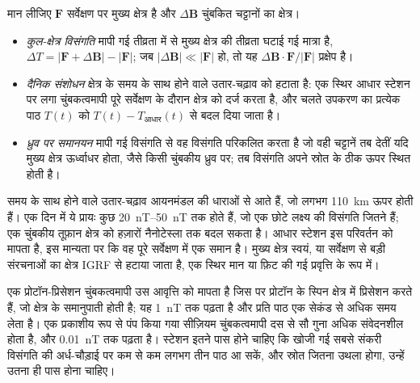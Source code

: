 \begin{definition}[कुल-क्षेत्र विसंगति; दैनिक संशोधन; ध्रुव पर समानयन]\label{def:b3:field-lab-methods-3:magnetic}
मान लीजिए $\mathbf{F}$ सर्वेक्षण पर मुख्य क्षेत्र है और $\Delta\mathbf{B}$
चुंबकित चट्टानों का क्षेत्र।
\begin{itemize}
  \item \emph{कुल-क्षेत्र विसंगति} मापी गई तीव्रता में से
        मुख्य क्षेत्र की तीव्रता घटाई गई मात्रा है, $\Delta T =
        |\mathbf{F} + \Delta\mathbf{B}| - |\mathbf{F}|$; जब
        $|\Delta\mathbf{B}| \ll |\mathbf{F}|$ हो, तो यह
        $\Delta\mathbf{B}\cdot\mathbf{F}/|\mathbf{F}|$ प्रक्षेप है।
  \item \emph{दैनिक संशोधन} क्षेत्र के समय के साथ होने वाले
        उतार-चढ़ाव को हटाता है: एक स्थिर आधार स्टेशन पर लगा चुंबकत्वमापी
        पूरे सर्वेक्षण के दौरान क्षेत्र को दर्ज करता है, और चलते उपकरण का प्रत्येक
        पाठ $T(t)$ को $T(t) -
        T_\text{आधार}(t)$ से बदल दिया जाता है।
  \item \emph{ध्रुव पर समानयन}
        मापी गई विसंगति से वह विसंगति परिकलित करता है जो वही चट्टानें
        तब देतीं यदि मुख्य क्षेत्र ऊर्ध्वाधर होता, जैसे किसी चुंबकीय
        ध्रुव पर; तब विसंगति अपने स्रोत के ठीक ऊपर स्थित होती है।
\end{itemize}
\end{definition}

समय के साथ होने वाले उतार-चढ़ाव आयनमंडल की धाराओं से आते हैं, जो लगभग
\qty{110}{km} ऊपर होती हैं। एक दिन में ये प्रायः कुछ
\qtyrange{20}{50}{nT} तक होते हैं, जो एक छोटे लक्ष्य की विसंगति जितने हैं; एक
चुंबकीय तूफ़ान क्षेत्र को हज़ारों नैनोटेस्ला तक बदल सकता है। आधार स्टेशन
इस परिवर्तन को मापता है, इस मान्यता पर कि वह
पूरे सर्वेक्षण में एक समान है। मुख्य क्षेत्र स्वयं, या सर्वेक्षण से बड़ी
संरचनाओं का क्षेत्र IGRF से हटाया जाता है, एक स्थिर मान
या फ़िट की गई प्रवृत्ति के रूप में।

एक प्रोटॉन-प्रिसेशन चुंबकत्वमापी उस आवृत्ति को मापता है जिस पर प्रोटॉन
के स्पिन क्षेत्र में प्रिसेशन करते हैं, जो क्षेत्र के समानुपाती होती है; यह
\qty{1}{nT} तक पढ़ता है और प्रति पाठ एक सेकंड से अधिक समय लेता है। एक
प्रकाशीय रूप से पंप किया गया सीज़ियम चुंबकत्वमापी दस से सौ गुना अधिक
संवेदनशील होता है, और \qty{0.01}{nT} तक पढ़ता है। स्टेशन इतने पास होने चाहिए
कि खोजी गई सबसे संकरी विसंगति की अर्ध-चौड़ाई पर कम से कम लगभग तीन पाठ आ सकें,
और स्रोत जितना उथला होगा, उन्हें
उतना ही पास होना चाहिए।

